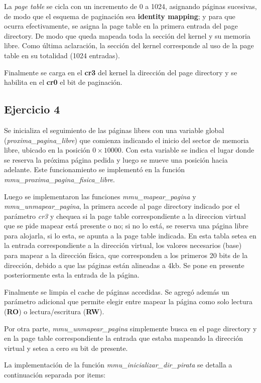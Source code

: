 La {\it page table\/} se cicla con un incremento de 0 a 1024,
asignando páginas sucesivas, de modo que el esquema de paginación sea
{\bf identity mapping}; y para que ocurra efectivamente, se asigna la page table
en la primera entrada del page directory.
De modo que queda mapeada toda la sección del kernel y su memoria libre.
Como última aclaración, la sección del kernel corresponde al uso de la page
table en su totalidad (1024 entradas).

Finalmente se carga en el {\bf cr3} del kernel la dirección del page directory y
se habilita en el {\bf cr0} el bit de paginación.


\subsection{Ejercicio 4}

Se inicializa el seguimiento de las páginas libres con una variable global
({\it proxima_pagina_libre\/}) que comienza indicando el inicio del sector de
memoria libre, ubicado en la posición $0\times10000$. Con esta variable se
indica el lugar donde se reserva la próxima página pedida y luego se mueve una
posición hacia adelante. Este funcionamiento se implementó en la función
{\it mmu_proxima_pagina_fisica_libre\/}.

Luego se implementaron las funciones {\it mmu_mapear_pagina\/} y
{\it mmu_unmapear_pagina\/}, la primera accede al page directory indicado por
el parámetro {\it cr3\/} y chequea si la page table correspondiente a la
direccion virtual que se pide mapear está presente o no; si no lo está, se
reserva una página libre para alojarla, si lo esta, se apunta a la page table
indicada. En esta tabla setea en la entrada correspondiente a la dirección
virtual, los valores necesarios (base) para mapear a la dirección física, que
corresponden a los primeros 20 bits de la dirección, debido a que las páginas
están alineadas a 4kb. Se pone en presente posteriormente esta la entrada de la
página.

Finalmente se limpia el cache de páginas accedidas. Se agregó además un
parámetro adicional que permite elegir entre mapear la página como
solo lectura ({\bf RO}) o lectura/escritura ({\bf RW}).

Por otra parte, {\it mmu_unmapear_pagina\/} simplemente busca en el page
directory y en la page table correspondiente la entrada que estaba mapeando la
dirección virtual y setea a cero su bit de presente.

La implementación de la función {\it mmu_inicializar_dir_pirata\/} se detalla a
continuación separada por items:

